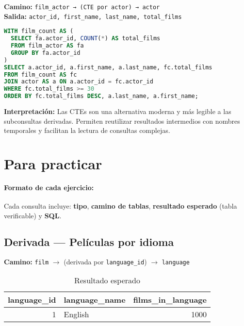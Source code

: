 \documentclass[12pt,a4paper]{article}
\begin{document}
\textbf{Camino:} \texttt{film\_actor → (CTE por actor) → actor}\\
\textbf{Salida:} \texttt{actor\_id, first\_name, last\_name, total\_films}\\

\begin{lstlisting}[language=SQL]
WITH film_count AS (
  SELECT fa.actor_id, COUNT(*) AS total_films
  FROM film_actor AS fa
  GROUP BY fa.actor_id
)
SELECT a.actor_id, a.first_name, a.last_name, fc.total_films
FROM film_count AS fc
JOIN actor AS a ON a.actor_id = fc.actor_id
WHERE fc.total_films >= 30
ORDER BY fc.total_films DESC, a.last_name, a.first_name;
\end{lstlisting}

\vspace{0.5em}
\textbf{Interpretación:}  
Las CTEs son una alternativa moderna y más legible a las subconsultas derivadas.  
Permiten reutilizar resultados intermedios con nombres temporales y facilitan la lectura de consultas complejas.

\section{Para practicar}

\paragraph{Formato de cada ejercicio:} Cada consulta incluye: \textbf{tipo}, \textbf{camino de tablas}, \textbf{resultado esperado} (tabla verificable) y \textbf{SQL}.

\subsection{Derivada — Películas por idioma}
\textbf{Camino:} \texttt{film} $\rightarrow$ (derivada por \texttt{language\_id}) $\rightarrow$ \texttt{language}

\begin{table}[h]
\centering
\caption{Resultado esperado}
\begin{tabular}{@{}r l r@{}}
\toprule
\textbf{language\_id} & \textbf{language\_name} & \textbf{films\_in\_language} \\
\midrule
1 & English & 1000 \\
\bottomrule
\end{tabular}
\end{table}
\end{document}
